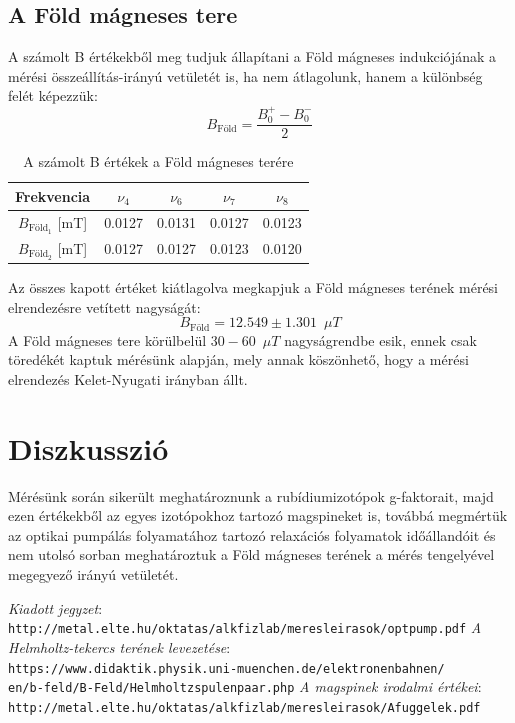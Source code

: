 \documentclass[12pt,a4paper]{article}
\begin{document}
\subsection{A Föld mágneses tere}
A számolt B értékekből meg tudjuk állapítani a Föld mágneses indukciójának a mérési összeállítás-irányú vetületét is, ha nem átlagolunk, hanem a különbség felét képezzük:
\begin{equation*}
B_{\textrm{Föld}} = \frac{B_0^+ - B_0^-}{2}
\end{equation*}
\begin{table}[!h]
\begin{center}
\begin{tabular}{| c || c || c || c || c ||}
\hline
Frekvencia & $\nu_4$ & $\nu_6$ & $\nu_7$ & $\nu_8$\\
\hline
$B_{\textrm{Föld}_1}$ [mT] & 0.0127 & 0.0131 & 0.0127 & 0.0123 \\
\hline
$B_{\textrm{Föld}_2}$ [mT] & 0.0127 & 0.0127 & 0.0123 & 0.0120 \\
\hline
\end{tabular}
\caption{A számolt B értékek a Föld mágneses terére}
\end{center}
\end{table}

Az összes kapott értéket kiátlagolva megkapjuk a Föld mágneses terének mérési elrendezésre vetített nagyságát:
\begin{equation*}
B_{\textrm{Föld}} = 12.549\pm 1.301\enspace \mu T 
\end{equation*}
A Föld mágneses tere körülbelül $30-60\enspace \mu T$ nagyságrendbe esik,  ennek csak töredékét kaptuk mérésünk alapján, mely annak köszönhető, hogy a mérési elrendezés Kelet-Nyugati irányban állt.


\section{Diszkusszió}
\hspace*{10pt} Mérésünk során sikerült meghatároznunk a rubídiumizotópok g-faktorait, majd ezen értékekből az egyes izotópokhoz tartozó magspineket is, továbbá megmértük az optikai pumpálás folyamatához tartozó relaxációs folyamatok időállandóit és nem utolsó sorban meghatároztuk a Föld mágneses terének a mérés tengelyével megegyező irányú vetületét.


\begin{thebibliography}{99}

 \emph{Kiadott jegyzet}:\\
\texttt{http://metal.elte.hu/oktatas/alkfizlab/meresleirasok/optpump.pdf}
 \emph{A Helmholtz-tekercs terének levezetése}:\\
\texttt{https://www.didaktik.physik.uni-muenchen.de/elektronenbahnen/\\en/b-feld/B-Feld/Helmholtzspulenpaar.php}
 \emph{A magspinek irodalmi értékei}:\\
\texttt{http://metal.elte.hu/oktatas/alkfizlab/meresleirasok/Afuggelek.pdf}

\end{thebibliography}
\end{document}

